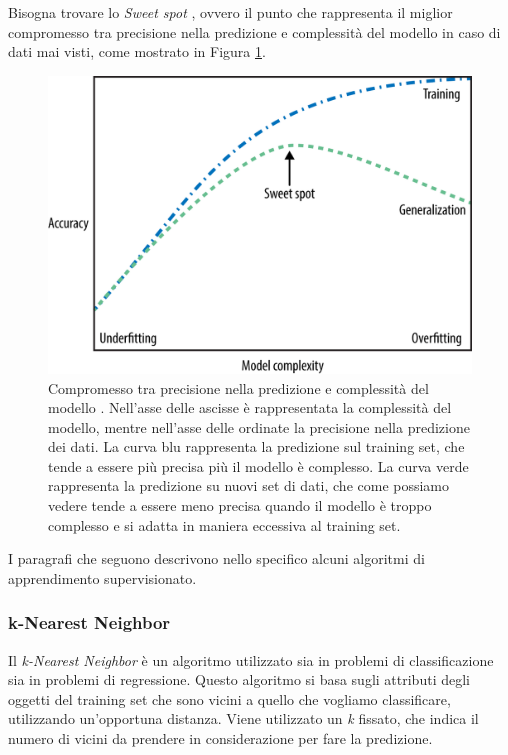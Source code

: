 \documentclass[a4paper,12pt]{report}
\begin{document}

Bisogna trovare lo \textit{Sweet spot} \cite{machine_learning_oreilly}, ovvero il punto che rappresenta il miglior compromesso tra precisione nella predizione e complessità del modello in caso di dati mai visti, come mostrato in Figura \ref{fig:sweet_spot}.
\begin{figure}[ht]
    \centering
    \includegraphics[scale = 0.35]{images/sweet_spot.png}
    \caption{Compromesso tra precisione nella predizione e complessità del modello \cite{figure_copyright}. Nell'asse delle ascisse è rappresentata la complessità del modello, mentre nell'asse delle ordinate la precisione nella predizione dei dati. La curva blu rappresenta la predizione sul training set, che tende a essere più precisa più il modello è complesso. La curva verde rappresenta la predizione su nuovi set di dati, che come possiamo vedere tende a essere meno precisa quando il modello è troppo complesso e si adatta in maniera eccessiva al training set.}
    \label{fig:sweet_spot}

\end{figure}


\bigskip
I paragrafi che seguono descrivono nello specifico alcuni algoritmi di apprendimento supervisionato.

\subsubsection{k-Nearest Neighbor}

Il \textit{k-Nearest Neighbor} è un algoritmo utilizzato sia in problemi di classificazione sia in problemi di regressione. 
Questo algoritmo si basa sugli attributi degli oggetti del training set che sono vicini a quello che vogliamo classificare, utilizzando un'opportuna distanza. Viene utilizzato un \textit{k} fissato, che indica il numero di vicini da prendere in considerazione per fare la predizione.
\end{document}

